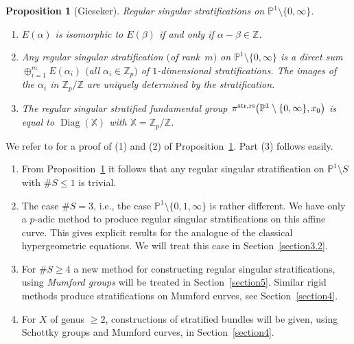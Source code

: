 \documentclass[pdftex]{sigma}
\numberwithin{equation}{section}
\newtheorem{Proposition}[Theorem]{Proposition}
\begin{document}
 \begin{Proposition}[Gieseker]\label{3.2} {\rm Regular singular stratifications on $\mathbb{P}^1\setminus \{0,\infty \} $}.
 \begin{enumerate}\itemsep=0pt
\item[$(1)$] $E(\alpha)$ is isomorphic to $E(\beta)$ if and only if $\alpha -\beta \in \mathbb{Z}$.
\item[$(2)$] Any regular singular stratification $($of rank~$m)$ on $\mathbb{P}^1\setminus \{0,\infty \}$ is a direct sum $\oplus_{i=1}^m E(\alpha _i)$ $($all $\alpha _i\in \mathbb{Z}_p)$ of $1$-dimensional stratifications. The images of the $\alpha_i$ in $\mathbb{Z}_p/\mathbb{Z}$ are uniquely determined by the stratification.
\item[$(3)$]The regular singular stratified fundamental group $\pi^{\rm str,rs}\big(\mathbb{P}^1\setminus \{0,\infty \},x_0\big)$ is equal to $\operatorname{Diag}(\mathbb{X})$ with
$\mathbb{X}=\mathbb{Z}_p/\mathbb{Z}$.
\end{enumerate}
 \end{Proposition}
 We refer to \cite[Section~4]{Gie} for a proof of (1) and (2) of Proposition~\ref{3.2}. Part (3) follows easily.

\begin{Remarks}\label{3.3}\quad
 \begin{enumerate}\itemsep=0pt
\item[(1)] From Proposition~\ref{3.2} it follows that any regular singular stratification on $\mathbb{P}^1\setminus S$ with $\#S\leq 1$ is trivial.
\item[(2)] The case $\# S=3$, i.e., the case $\mathbb{P}^1\setminus \{0,1,\infty \}$ is rather different. We have only a $p$-adic method to produce regular singular stratifications on this affine curve. This gives explicit results for the analogue of the classical hypergeometric equations. We will treat this case in Section~\ref{section3.2}.
\item[(3)] For $\# S\geq 4$ a new method for constructing regular singular stratifications, using {\it Mumford groups} will be treated in Section~\ref{section5}. Similar rigid methods produce stratifications on Mumford curves, see Section~\ref{section4}.
\item[(4)] For $X$ of genus $\geq 2$, constructions of stratified bundles will be given, using Schottky groups and Mumford curves, in Section~\ref{section4}.
\end{enumerate}
\end{Remarks}
\end{document}
